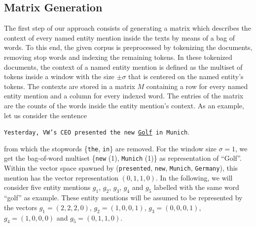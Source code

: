 \subsection{Matrix Generation}
The first step of our approach consists of generating a matrix which describes the context of every named entity mention inside the texts by means of a bag of words.
To this end, the given corpus is preprocessed by tokenizing the documents, removing stop words and indexing the remaining tokens.
In these tokenized documents, the context of a named entity mention is defined as the multiset of tokens inside a window with the size $\pm \sigma$ that is centered on the named entity's tokens.
The contexts are stored in a matrix $M$ containing a row for every named entity mention and a column for every indexed word.
The entries of the matrix are the counts of the words inside the entity mention's context.
As an example, let us consider the sentence 
\begin{ex}
\texttt{Yesterday, VW's CEO presented the new \underline{Golf} in Munich}.
\end{ex}
from which the stopwords \{\texttt{the}, \texttt{in}\} are removed.
For the window size $\sigma = 1$, we get the bag-of-word multiset \{\texttt{new} (1), \texttt{Munich} (1)\} as representation of ``Golf''.
Within the vector space spawned by (\texttt{presented}, \texttt{new}, \texttt{Munich}, \texttt{Germany}), this mention has the vector representation $(0, 1, 1, 0)$.
In the following, we will consider five entity mentions $g_1$, $g_2$, $g_3$, $g_4$ and $g_5$ labelled with the same word ``golf'' as example. 
These entity mentions will be assumed to be represented by the vectors 
$g_1 = (2,2,2,0)$, $g_2 = (1, 0, 0, 1)$, $g_3= (0,0,0,1)$, $g_4=(1, 0, 0, 0)$ and $g_5=(0, 1,1,0)$. 

